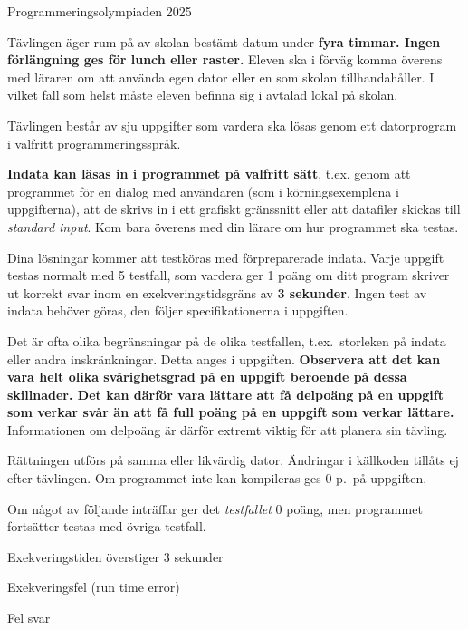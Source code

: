 

\thispagestyle{fancy}
\lstset{basicstyle=\ttfamily,
  breaklines=true}

\begin{center}
\Huge{Programmeringsolympiaden 2025}
\end{center}
\vspace{-1.2cm} 
\begin{lista}
\item Tävlingen äger rum på av skolan bestämt datum under {\bf fyra
    timmar. Ingen förlängning ges för lunch eller raster.} Eleven ska i förväg komma överens med läraren om att använda egen dator eller en som skolan tillhandahåller. I vilket fall som helst måste eleven befinna sig i avtalad lokal på skolan. 
\item Tävlingen består av sju uppgifter som vardera ska lösas genom ett
  datorprogram i valfritt programmeringsspråk.
\item {\bf Indata kan läsas in i programmet på valfritt sätt}, t.ex. genom att programmet för en dialog med användaren (som i körningsexemplena i uppgifterna), att de skrivs in i ett grafiskt gränssnitt eller att datafiler skickas till {\em standard input}. Kom bara överens med din lärare om hur programmet ska testas.
\item Dina lösningar kommer att testköras med förpreparerade
  indata. Varje uppgift testas normalt med 5 testfall, som vardera ger
  1 poäng om ditt program skriver ut korrekt svar inom en exekveringstidsgräns av
  {\bf 3 sekunder}. Ingen test av indata behöver göras, den följer specifikationerna 
i uppgiften.
\item Det är ofta olika begränsningar på de olika testfallen, t.ex.\ storleken på
indata eller andra inskränkningar. Detta anges i uppgiften. {\bf Observera att det kan vara
helt olika svårighetsgrad på en uppgift beroende på dessa skillnader. Det kan därför vara
lättare att få delpoäng på en uppgift som verkar svår än att få full
poäng på en uppgift som verkar lättare.} Informationen om delpoäng är
därför extremt viktig för att planera sin
tävling.
\item Rättningen utförs på samma eller likvärdig dator. Ändringar
  i källkoden tillåts ej efter tävlingen. Om programmet
  inte kan kompileras ges 0 p.\ på uppgiften. 
\item Om något av följande inträffar ger
  det {\em testfallet} 0 poäng, men programmet fortsätter testas med övriga testfall.
\begin{lista}
\item Exekveringstiden överstiger 3 sekunder \vspace{-0.2cm}
\item Exekveringsfel (run time error) \vspace{-0.2cm}
\item Fel svar \vspace{-0.2cm}
\end{lista}


\end{lista}

